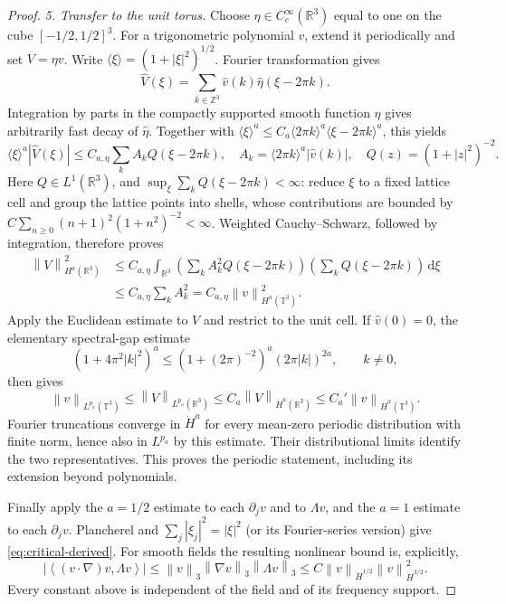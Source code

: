 \documentclass[11pt,a4paper]{article}
\theoremstyle{definition}\newtheorem{definition}[theorem]{Definition}
\theoremstyle{remark}\newtheorem{remark}[theorem]{Remark}
\newcommand{\R}{\mathbb R}\newcommand{\TT}{\mathbb T^3}
\newcommand{\dd}{\,\mathrm d}\newcommand{\eps}{\varepsilon}
\newcommand{\norm}[1]{\left\lVert#1\right\rVert}
\newcommand{\ip}[2]{\left\langle#1,#2\right\rangle}
\begin{document}
\begin{proof}
\emph{5. Transfer to the unit torus.}
Choose $\eta\in C_c^\infty(\R^3)$ equal to one on the cube
$[-1/2,1/2]^3$.  For a trigonometric polynomial $v$, extend it periodically
and set $V=\eta v$.  Write $\langle\xi\rangle=(1+|\xi|^2)^{1/2}$.
Fourier transformation gives
\[
 \widehat V(\xi)=\sum_{k\in\mathbb Z^3}\widehat v(k)
                                  \widehat\eta(\xi-2\pi k).
\]
Integration by parts in the compactly supported smooth function $\eta$
gives arbitrarily fast decay of $\widehat\eta$.  Together with
$\langle\xi\rangle^a\le C_a\langle2\pi k\rangle^a
\langle\xi-2\pi k\rangle^a$, this yields
\[
 \langle\xi\rangle^a|\widehat V(\xi)|
 \le C_{a,\eta}\sum_k A_k Q(\xi-2\pi k),
 \quad
 A_k=\langle2\pi k\rangle^a|\widehat v(k)|,
 \quad Q(z)=(1+|z|^2)^{-2}.
\]
Here $Q\in L^1(\R^3)$, and
$\sup_\xi\sum_k Q(\xi-2\pi k)<\infty$: reduce $\xi$ to a fixed
lattice cell and group the lattice points into shells, whose contributions
are bounded by $C\sum_{n\ge0}(n+1)^2(1+n^2)^{-2}<\infty$.
Weighted Cauchy--Schwarz, followed by integration, therefore proves
\begin{align*}
 \norm{V}_{H^a(\R^3)}^2
 &\le C_{a,\eta}\int_{\R^3}
       \left(\sum_k A_k^2Q(\xi-2\pi k)\right)
       \left(\sum_k Q(\xi-2\pi k)\right)\dd\xi\\
 &\le C_{a,\eta}\sum_k A_k^2
  =C_{a,\eta}\norm{v}_{H^a(\TT)}^2.
\end{align*}
Apply the Euclidean estimate to $V$ and restrict to the unit cell.  If
$\widehat v(0)=0$, the elementary spectral-gap estimate
\[
 (1+4\pi^2|k|^2)^a
 \le(1+(2\pi)^{-2})^a(2\pi|k|)^{2a},\qquad k\ne0,
\]
then gives
\[
 \norm{v}_{L^{p_a}(\TT)}
 \le\norm{V}_{L^{p_a}(\R^3)}
 \le C_a\norm{V}_{\dot H^a(\R^3)}
 \le C_a'\norm{v}_{\dot H^a(\TT)}.
\]
Fourier truncations converge in $\dot H^a$ for every mean-zero periodic
distribution with finite norm, hence also in $L^{p_a}$ by this estimate.
Their distributional limits identify the two representatives.  This proves
the periodic statement, including its extension beyond polynomials.

Finally apply the $a=1/2$ estimate to each $\partial_jv$ and to $\Lambda v$,
and the $a=1$ estimate to each $\partial_jv$.  Plancherel and
$\sum_j|\xi_j|^2=|\xi|^2$ (or its Fourier-series version) give
\eqref{eq:critical-derived}.  For smooth fields the resulting nonlinear
bound is, explicitly,
\[
 |\ip{(v\cdot\nabla)v}{\Lambda v}|
 \le\norm{v}_3\norm{\nabla v}_3\norm{\Lambda v}_3
 \le C\norm{v}_{\dot H^{1/2}}\norm{v}_{\dot H^{3/2}}^2.
\]
Every constant above is independent of the field and of its frequency
support.
\end{proof}
\end{document}
